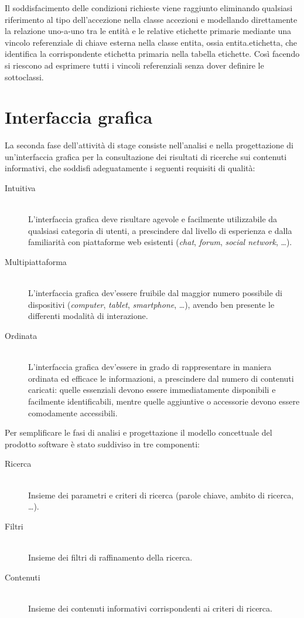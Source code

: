 Il soddisfacimento delle condizioni richieste viene raggiunto eliminando qualsiasi riferimento al tipo dell'accezione nella classe \textsf{accezioni} e modellando direttamente la relazione uno-a-uno tra le entità e le relative etichette primarie mediante una vincolo referenziale di chiave esterna nella classe \textsf{entita}, ossia \textsf{entita.etichetta}, che identifica la corrispondente etichetta primaria nella tabella \textsf{etichette}. Così facendo si riescono ad esprimere tutti i vincoli referenziali senza dover definire le sottoclassi.

\section{Interfaccia grafica}
\label{sec:tesi:stage:gui}
La seconda fase dell'attività di stage consiste nell'analisi e nella progettazione di un'interfaccia grafica per la consultazione dei risultati di ricerche sui contenuti informativi, che soddisfi adeguatamente i seguenti requisiti di qualità:
\begin{description}
	\item[Intuitiva] \hfill \\
	L'interfaccia grafica deve risultare agevole e facilmente utilizzabile da qualsiasi categoria di utenti, a prescindere dal livello di esperienza e dalla familiarità con piattaforme web esistenti (\textit{chat}, \textit{forum}, \textit{social network}, \ldots).
	\item[Multipiattaforma] \hfill \\
	L'interfaccia grafica dev'essere fruibile dal maggior numero possibile di dispositivi (\textit{computer}, \textit{tablet}, \textit{smartphone}, \ldots), avendo ben presente le differenti modalità di interazione.
	\item[Ordinata] \hfill \\
	L'interfaccia grafica dev'essere in grado di rappresentare in maniera ordinata ed efficace le informazioni, a prescindere dal numero di contenuti caricati: quelle essenziali devono essere immediatamente disponibili e facilmente identificabili, mentre quelle aggiuntive o accessorie devono essere comodamente accessibili.
\end{description}

Per semplificare le fasi di analisi e progettazione il modello concettuale del prodotto software è stato suddiviso in tre componenti:
\begin{description}
 	\item[Ricerca] \hfill \\
 	Insieme dei parametri e criteri di ricerca (parole chiave, ambito di ricerca, \ldots).
 	\item[Filtri] \hfill \\
 	Insieme dei filtri di raffinamento della ricerca.
 	\item[Contenuti] \hfill \\
 	Insieme dei contenuti informativi corrispondenti ai criteri di ricerca.
 \end{description}
 
